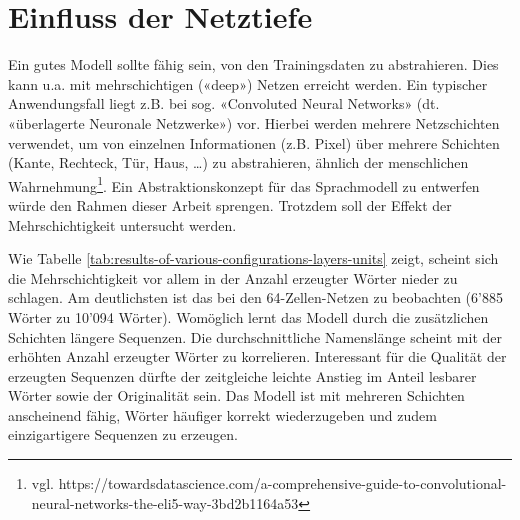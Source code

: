 \section{Einfluss der Netztiefe}
\label{sec:increase-lstm-layers}

Ein gutes Modell sollte fähig sein, von den Trainingsdaten zu abstrahieren.
Dies kann u.a. mit mehrschichtigen («deep») Netzen erreicht werden.
Ein typischer Anwendungsfall liegt z.B. bei sog. «Convoluted Neural Networks» (dt. «überlagerte Neuronale Netzwerke») vor.
Hierbei werden mehrere Netzschichten verwendet, um von einzelnen Informationen (z.B. Pixel) über mehrere
Schichten (Kante, Rechteck, Tür, Haus, …) zu abstrahieren, ähnlich der menschlichen Wahrnehmung\footnote{vgl. https://towardsdatascience.com/a-comprehensive-guide-to-convolutional-neural-networks-the-eli5-way-3bd2b1164a53}.
Ein Abstraktionskonzept für das Sprachmodell zu entwerfen würde den Rahmen dieser Arbeit sprengen.
Trotzdem soll der Effekt der Mehrschichtigkeit untersucht werden.

Wie Tabelle \ref{tab:results-of-various-configurations-layers-units} zeigt, scheint sich die Mehrschichtigkeit
vor allem in der Anzahl erzeugter Wörter nieder zu schlagen.
Am deutlichsten ist das bei den 64-Zellen-Netzen zu beobachten (6'885 Wörter zu 10'094 Wörter).
Womöglich lernt das Modell durch die zusätzlichen Schichten längere Sequenzen.
Die durchschnittliche Namenslänge scheint mit der erhöhten Anzahl erzeugter Wörter zu korrelieren.
Interessant für die Qualität der erzeugten Sequenzen dürfte der zeitgleiche leichte Anstieg im Anteil lesbarer Wörter sowie der Originalität sein.
Das Modell ist mit mehreren Schichten anscheinend fähig, Wörter häufiger korrekt wiederzugeben und zudem einzigartigere Sequenzen zu erzeugen.

